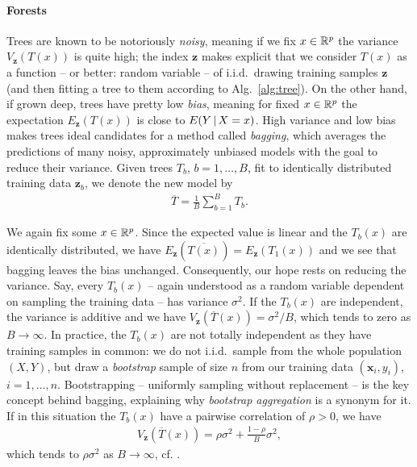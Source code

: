 \paragraph{Forests}
Trees are known to be notoriously \textit{noisy}, meaning if we fix $x \in \mathbb{R}^p$ the variance 
$V_\mathbf{z}(T(x))$ is quite high; the index $\mathbf{z}$ makes explicit that we consider $T(x)$ as 
a function -- or better: random variable -- of i.i.d.\ drawing training samples $\mathbf{z}$ (and 
then fitting a tree to them according to Alg.\ \ref{alg:tree}). On the other hand, if grown deep,
trees have pretty low \textit{bias}, meaning for fixed $x \in \mathbb{R}^p$ the expectation $E_\mathbf{z}(T(x))$ 
is close to $E(Y \,|\, X = x)$. High variance and low bias makes trees 
ideal candidates for a method called \textit{bagging}, which averages the predictions of many noisy, 
approximately unbiased models with the goal to reduce their variance. Given trees $T_b$, $b = 1, 
\ldots, B$, fit to identically distributed training data $\mathbf{z}_b$, we denote the new model by 
\begin{align}
    \overline{T} = \frac{1}{B} \sum_{b=1}^B T_b.
\end{align}

We again fix some $x \in \mathbb{R}^p$. Since the expected value is linear and the $T_b(x)$ are identically 
distributed, we have $E_\mathbf{z}(\overline{T(x)}) = E_\mathbf{z}(T_1(x))$ and we see that bagging 
leaves the bias unchanged. Consequently, our hope rests on reducing the variance. Say, every 
$T_b(x)$ -- again understood as a random variable dependent on sampling the training data -- has 
variance $\sigma^2$. If the $T_b(x)$ are independent, the variance is additive and we have 
$V_\mathbf{z}(\overline{T}(x)) = \sigma^2/B$, which tends to zero as $B \to \infty$. In practice, 
the $T_b(x)$ are not totally independent as they have training samples in common: we do not i.i.d.\ 
sample from the whole population $(X, Y)$, but draw a \textit{bootstrap} sample of size $n$ from our training 
data $(\mathbf{x}_i, y_i)$, $i = 1, \ldots, n$. Bootstrapping -- uniformly sampling without 
replacement -- is the key concept behind bagging, 
explaining why \textit{bootstrap aggregation} is a synonym for it. If in this 
situation the $T_b(x)$ have a pairwise correlation of $\rho > 0$, we have 
\begin{align}
    V_\mathbf{z}\left(\overline{T}(x)\right) = \rho \sigma^2 + \frac{1-\rho}{B} \sigma^2,
\end{align}
which tends to $\rho \sigma^2$ as $B \to \infty$, cf. \cite[Eq. (15.1)]{elem-stat-learn01}.

